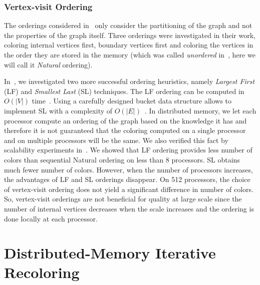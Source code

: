\documentclass{article}
\newcommand{\card}[1]{\ensuremath{|#1|}}
\begin{document}
\subsubsection{Vertex-visit Ordering}

The orderings considered in~\cite{BGMBC-jpdc} only consider the 
partitioning of the graph and not the properties of the graph
itself. Three orderings were investigated in their work, coloring
internal vertices first, boundary vertices first and coloring the
vertices in the order they are stored in the memory (which was called
{\em unordered} in~\cite{BGMBC-jpdc}, here we will call it {\em Natural} ordering).

In~\cite{HiPC11}, we investigated two more successful ordering heuristics,
namely {\em Largest First} (LF) and {\em Smallest Last} (SL)
techniques.  The LF ordering can be computed in $O(\card{V})$ time~\cite{Welsh01011967}.
Using a carefully designed bucket data structure allows to implement SL with a
complexity of $O(\card{E})$~\cite{Matula1983}. In distributed memory, we let each
processor compute an ordering of the graph based on the knowledge it has and
therefore it is not guaranteed that the coloring computed on a single processor and on multiple
processors will be the same. We also verified this fact by scalability experiments
in~\cite{HiPC11}. We showed that LF ordering provides less number of colors than
sequential Natural ordering on less than 8 processors. SL obtains much fewer number
of colors. However, when the number of processors increases, the advantages of
LF and SL orderings disappear. On 512 processors, the choice of vertex-visit
ordering does not yield a significant difference in number of colors. So, vertex-visit orderings
are not beneficial for quality at large scale since the number of internal
vertices decreases when the scale increases and the ordering is done locally at each processor.



\section{Distributed-Memory Iterative Recoloring}
\label{sec:improv}
\end{document}
